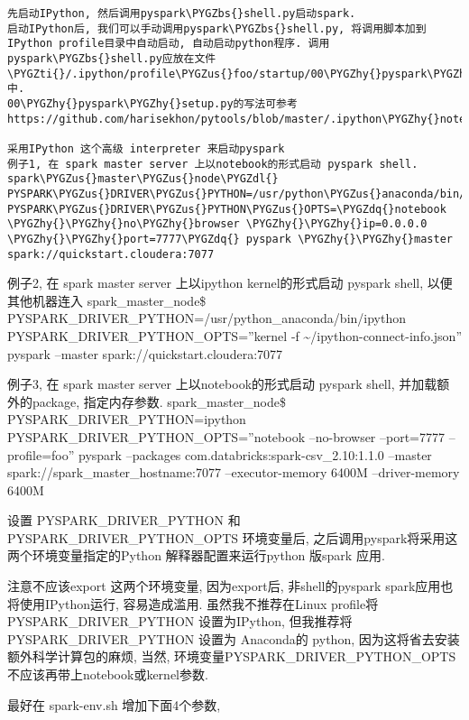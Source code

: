 \documentclass[letterpaper,10pt,english]{sphinxmanual}
\def\PYGZbs{\char`\\}
\def\PYGZus{\char`\_}
\def\PYGZdl{\char`\$}
\def\PYGZhy{\char`\-}
\def\PYGZdq{\char`\"}
\def\PYGZti{\char`\~}
\begin{document}
\begin{Verbatim}[commandchars=\\\{\}]
先启动IPython, 然后调用pyspark\PYGZbs{}shell.py启动spark.
启动IPython后, 我们可以手动调用pyspark\PYGZbs{}shell.py, 将调用脚本加到IPython profile目录中自动启动, 自动启动python程序. 调用pyspark\PYGZbs{}shell.py应放在文件 \PYGZti{}/.ipython/profile\PYGZus{}foo/startup/00\PYGZhy{}pyspark\PYGZhy{}setup.py 中.
00\PYGZhy{}pyspark\PYGZhy{}setup.py的写法可参考 https://github.com/harisekhon/pytools/blob/master/.ipython\PYGZhy{}notebook\PYGZhy{}pyspark.00\PYGZhy{}pyspark\PYGZhy{}setup.py

采用IPython 这个高级 interpreter 来启动pyspark
例子1, 在 spark master server 上以notebook的形式启动 pyspark shell.
spark\PYGZus{}master\PYGZus{}node\PYGZdl{} PYSPARK\PYGZus{}DRIVER\PYGZus{}PYTHON=/usr/python\PYGZus{}anaconda/bin/ipython PYSPARK\PYGZus{}DRIVER\PYGZus{}PYTHON\PYGZus{}OPTS=\PYGZdq{}notebook \PYGZhy{}\PYGZhy{}no\PYGZhy{}browser \PYGZhy{}\PYGZhy{}ip=0.0.0.0 \PYGZhy{}\PYGZhy{}port=7777\PYGZdq{} pyspark \PYGZhy{}\PYGZhy{}master spark://quickstart.cloudera:7077
\end{Verbatim}

例子2, 在 spark master server 上以ipython kernel的形式启动 pyspark
shell, 以便其他机器连入 spark\_master\_node\$
PYSPARK\_DRIVER\_PYTHON=/usr/python\_anaconda/bin/ipython
PYSPARK\_DRIVER\_PYTHON\_OPTS=''kernel -f \textasciitilde{}/ipython-connect-info.json''
pyspark --master spark://quickstart.cloudera:7077

例子3, 在 spark master server 上以notebook的形式启动 pyspark shell,
并加载额外的package, 指定内存参数. spark\_master\_node\$
PYSPARK\_DRIVER\_PYTHON=ipython PYSPARK\_DRIVER\_PYTHON\_OPTS=''notebook
--no-browser --port=7777 --profile=foo'' pyspark --packages
com.databricks:spark-csv\_2.10:1.1.0 --master
spark://spark\_master\_hostname:7077 --executor-memory 6400M
--driver-memory 6400M

设置 PYSPARK\_DRIVER\_PYTHON 和 PYSPARK\_DRIVER\_PYTHON\_OPTS
环境变量后, 之后调用pyspark将采用这两个环境变量指定的Python
解释器配置来运行python 版spark 应用.

注意不应该export 这两个环境变量, 因为export后, 非shell的pyspark
spark应用也将使用IPython运行, 容易造成滥用. 虽然我不推荐在Linux
profile将 PYSPARK\_DRIVER\_PYTHON 设置为IPython, 但我推荐将
PYSPARK\_DRIVER\_PYTHON 设置为 Anaconda的 python,
因为这将省去安装额外科学计算包的麻烦, 当然,
环境变量PYSPARK\_DRIVER\_PYTHON\_OPTS不应该再带上notebook或kernel参数.

最好在 spark-env.sh 增加下面4个参数,
\end{document}
